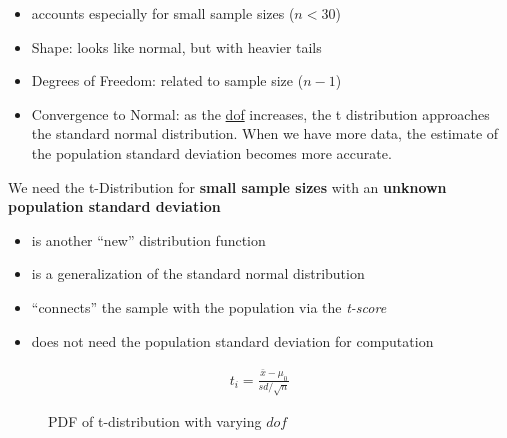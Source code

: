 \documentclass[
  a4paper,
]{scrbook}
\providecommand{\tightlist}{%
  \setlength{\itemsep}{0pt}\setlength{\parskip}{0pt}}\usepackage{longtable,booktabs,array}
\begin{document}
\begin{itemize}
\tightlist
\item
  accounts especially for small sample sizes (\(n<30\))
\item
  Shape: looks like normal, but with heavier tails
\item
  Degrees of Freedom: related to sample size (\(n-1\))
\item
  Convergence to Normal: as the \hyperref[acronyms_dof]{dof} increases,
  the t distribution approaches the standard normal distribution. When
  we have more data, the estimate of the population standard deviation
  becomes more accurate.
\end{itemize}

We need the t-Distribution for \textbf{small sample sizes} with an
\textbf{unknown population standard deviation}

\begin{itemize}
\tightlist
\item
  is another ``new'' distribution function
\item
  is a generalization of the standard normal distribution
\item
  ``connects'' the sample with the population via the \emph{t-score}
\item
  does not need the population standard deviation for computation
\end{itemize}

\begin{align}
t_i = \frac{\bar{x} - \mu_0}{sd/\sqrt{n}} \label{tscore}
\end{align}

\begin{figure}[ht]


\caption{\label{fig-t-dist-sl}PDF of t-distribution with varying
\(dof\)}

\end{figure}%
\end{document}
